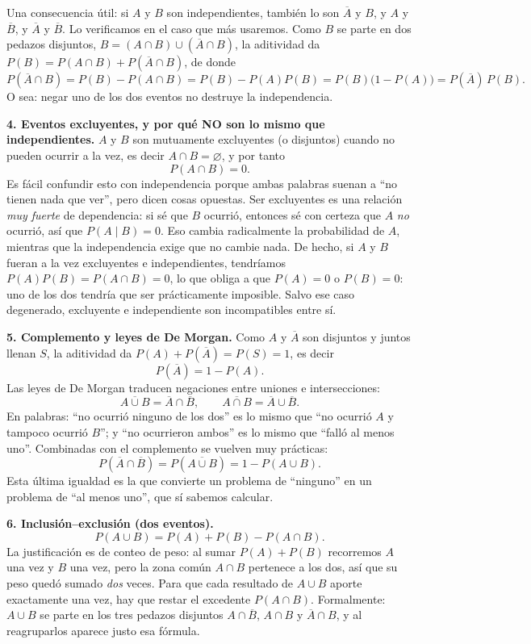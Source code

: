 \documentclass[11pt]{article}
\begin{document}
\begin{teo}
Una consecuencia útil: si $A$ y $B$ son independientes, también lo son $\overline{A}$ y $B$, y $A$ y $\overline{B}$, y $\overline{A}$ y $\overline{B}$. Lo verificamos en el caso que más usaremos. Como $B$ se parte en dos pedazos disjuntos, $B=(A\cap B)\cup(\overline{A}\cap B)$, la aditividad da $P(B)=P(A\cap B)+P(\overline{A}\cap B)$, de donde
\[
P(\overline{A}\cap B)=P(B)-P(A\cap B)=P(B)-P(A)P(B)=P(B)\bigl(1-P(A)\bigr)=P(\overline{A})\,P(B).
\]
O sea: negar uno de los dos eventos no destruye la independencia.

\medskip
\textbf{4. Eventos excluyentes, y por qué NO son lo mismo que independientes.}
$A$ y $B$ son mutuamente excluyentes (o disjuntos) cuando no pueden ocurrir a la vez, es decir $A\cap B=\varnothing$, y por tanto
\[
P(A\cap B)=0.
\]
Es fácil confundir esto con independencia porque ambas palabras suenan a ``no tienen nada que ver'', pero dicen cosas opuestas. Ser excluyentes es una relación \emph{muy fuerte} de dependencia: si sé que $B$ ocurrió, entonces sé con certeza que $A$ \emph{no} ocurrió, así que $P(A\mid B)=0$. Eso cambia radicalmente la probabilidad de $A$, mientras que la independencia exige que no cambie nada. De hecho, si $A$ y $B$ fueran a la vez excluyentes e independientes, tendríamos $P(A)P(B)=P(A\cap B)=0$, lo que obliga a que $P(A)=0$ o $P(B)=0$: uno de los dos tendría que ser prácticamente imposible. Salvo ese caso degenerado, excluyente e independiente son incompatibles entre sí.

\medskip
\textbf{5. Complemento y leyes de De Morgan.}
Como $A$ y $\overline{A}$ son disjuntos y juntos llenan $S$, la aditividad da $P(A)+P(\overline{A})=P(S)=1$, es decir
\[
P(\overline{A})=1-P(A).
\]
Las leyes de De Morgan traducen negaciones entre uniones e intersecciones:
\[
\overline{A\cup B}=\overline{A}\cap\overline{B},
\qquad
\overline{A\cap B}=\overline{A}\cup\overline{B}.
\]
En palabras: ``no ocurrió ninguno de los dos'' es lo mismo que ``no ocurrió $A$ y tampoco ocurrió $B$''; y ``no ocurrieron ambos'' es lo mismo que ``falló al menos uno''. Combinadas con el complemento se vuelven muy prácticas:
\[
P(\overline{A}\cap\overline{B})=P(\overline{A\cup B})=1-P(A\cup B).
\]
Esta última igualdad es la que convierte un problema de ``ninguno'' en un problema de ``al menos uno'', que sí sabemos calcular.

\medskip
\textbf{6. Inclusión--exclusión (dos eventos).}
\[
P(A\cup B)=P(A)+P(B)-P(A\cap B).
\]
La justificación es de conteo de peso: al sumar $P(A)+P(B)$ recorremos $A$ una vez y $B$ una vez, pero la zona común $A\cap B$ pertenece a los dos, así que su peso quedó sumado \emph{dos} veces. Para que cada resultado de $A\cup B$ aporte exactamente una vez, hay que restar el excedente $P(A\cap B)$. Formalmente: $A\cup B$ se parte en los tres pedazos disjuntos $A\cap\overline{B}$, $A\cap B$ y $\overline{A}\cap B$, y al reagruparlos aparece justo esa fórmula.


\end{teo}
\end{document}
